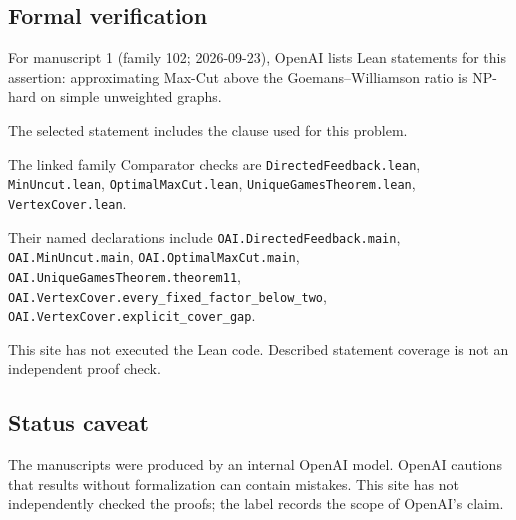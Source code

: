 \documentclass[11pt]{article}
\begin{document}
\subsection{Formal verification}
For manuscript 1 (family 102; 2026-09-23), OpenAI lists Lean statements for this assertion: approximating Max-Cut above the Goemans--Williamson ratio is NP-hard on simple unweighted graphs.

The selected statement includes the clause used for this problem.

The linked family Comparator checks are \texttt{DirectedFeedback.lean}, \texttt{MinUncut.lean}, \texttt{OptimalMaxCut.lean}, \texttt{UniqueGamesTheorem.lean}, \texttt{VertexCover.lean}.

Their named declarations include \texttt{OAI.DirectedFeedback.main}, \texttt{OAI.MinUncut.main}, \texttt{OAI.OptimalMaxCut.main}, \texttt{OAI.UniqueGamesTheorem.theorem11}, \texttt{OAI.VertexCover.every\_fixed\_factor\_below\_two}, \texttt{OAI.VertexCover.explicit\_cover\_gap}.

This site has not executed the Lean code. Described statement coverage is not an independent proof check.

\subsection{Status caveat}
The manuscripts were produced by an internal OpenAI model. OpenAI cautions that results without formalization can contain mistakes. This site has not independently checked the proofs; the label records the scope of OpenAI's claim.
\end{document}
